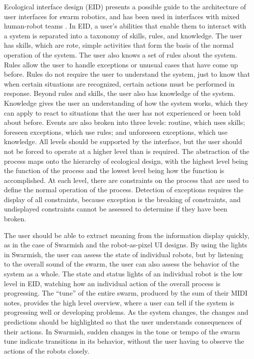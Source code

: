 Ecological interface design (EID) presents a possible guide to the architecture of user interfaces for swarm robotics, and has been used in interfaces with mixed human-robot teams \citep{vicente1992ecological, gancet2010user}. 
In EID, a user's abilities that enable them to interact with a system is separated into a taxonomy of skills, rules, and knowledge. 
The user has skills, which are rote, simple activities that form the basis of the normal operation of the system. 
The user also knows a set of rules about the system. 
Rules allow the user to handle exceptions or unusual cases that have come up before. 
Rules do not require the user to understand the system, just to know that when certain situations are recognized, certain actions must be performed in response. 
Beyond rules and skills, the user also has knowledge of the system. 
Knowledge gives the user an understanding of how the system works, which they can apply to react to situations that the user has not experienced or been told about before. 
Events are also broken into three levels: routine, which uses skills; foreseen exceptions, which use rules; and unforeseen exceptions, which use knowledge. 
All levels should be supported by the interface, but the user should not be forced to operate at a higher level than is required. 
The abstraction of the process maps onto the hierarchy of ecological design, with the highest level being the function of the process and the lowest level being how the function is accomplished. 
At each level, there are constraints on the process that are used to define the normal operation of the process.
Detection of exceptions requires the display of all constraints, because exception is the breaking of constraints, and undisplayed constraints cannot be assessed to determine if they have been broken.

The user should be able to extract meaning from the information display quickly, as in the case of Swarmish and the robot-as-pixel UI designs.
By using the lights in Swarmish, the user can assess the state of individual robots, but by listening to the overall sound of the swarm, the user can also assess the behavior of the system as a whole.
The state and status lights of an individual robot is the low level in EID, watching how an individual action of the overall process is progressing. 
The ``tune'' of the entire swarm, produced by the sum of their MIDI notes, provides the high level overview, where a user can tell if the system is progressing well or developing problems. 
As the system changes, the changes and predictions should be highlighted so that the user understands consequences of their actions. 
In Swarmish, sudden changes in the tone or tempo of the swarm tune indicate transitions in its behavior, without the user having to observe the actions of the robots closely. 


